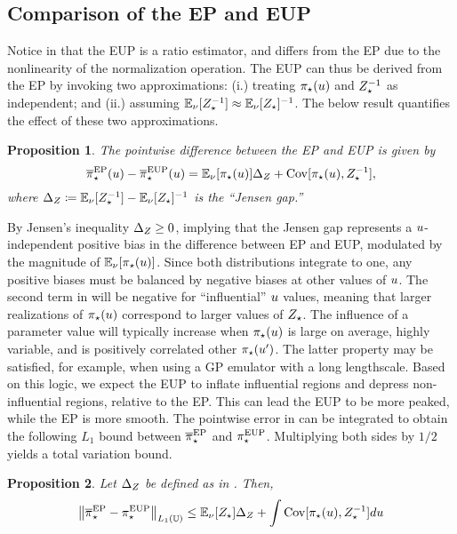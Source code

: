 \documentclass[12pt]{article}
\newtheorem{prop}{Proposition}
\begin{document}
\subsection{Comparison of the EP and EUP}
Notice in  that the EUP is a ratio estimator, and differs from 
the EP due to the nonlinearity of the normalization operation. The EUP can thus 
be derived from the EP by invoking two approximations: 
(i.) treating ${\pi}_{\star}(u)$ and ${Z}_{\star}^{-1}$ as independent; and 
(ii.) assuming $\mathbb{E}_{\nu}[{Z}_{\star}^{-1}] \approx \mathbb{E}_{\nu}[{Z}_{\star}]^{-1}$.
The below result quantifies the effect of these two approximations.

\begin{prop} \label{prop:ep-eup-pw-err}
The pointwise difference between the EP and EUP is given by
\begin{equation}
{\overline{\pi}}_{\star}^{\mathrm{EP}}(u) - {\overline{\pi}}_{\star}^{\mathrm{EUP}}(u)
= \mathbb{E}_{\nu}[{\pi}_{\star}(u)] \Delta_Z + \mathrm{Cov}[{\pi}_{\star}(u), {Z}_{\star}^{-1}],
\label{eq:ep-eup-pw-err}
\end{equation}
where $\Delta_Z \coloneqq \mathbb{E}_{\nu}[{Z}_{\star}^{-1}] - \mathbb{E}_{\nu}[{Z}_{\star}]^{-1}$
is the ``Jensen gap.''
\end{prop}

By Jensen's inequality $\Delta_Z \geq 0$, implying that the Jensen gap represents a 
$u$-independent positive bias in the difference between EP and EUP, modulated by the magnitude of 
$\mathbb{E}_{\nu}[{\pi}_{\star}(u)]$. Since both distributions integrate to one, any positive 
biases must be balanced by negative biases at other values of $u$.
The second term in  will be negative for ``influential'' $u$ values, 
meaning that larger realizations of ${\pi}_{\star}(u)$ correspond to larger values of 
${Z}_{\star}$. The influence of a parameter value will typically increase when 
${\pi}_{\star}(u)$ is large on average, highly variable, and is positively correlated other 
${\pi}_{\star}(u^\prime)$. The latter property may be satisfied, for example, when using 
a GP emulator with a long lengthscale. Based on this logic, we expect the EUP to inflate 
influential regions and depress non-influential regions, relative to the EP. This can lead 
the EUP to be more peaked, while the EP is more smooth. The pointwise error in 
 can be integrated to obtain the following $L_1$ bound 
between ${\overline{\pi}}_{\star}^{\mathrm{EP}}$ and ${\pi}_{\star}^{\mathrm{EUP}}$. Multiplying both sides by $1/2$
yields a total variation bound.

\begin{prop} \label{prop:ep-eup-TV-err}
Let $\Delta_Z$ be defined as in . Then,
\begin{equation}
\left\lVert{\overline{\pi}}_{\star}^{\mathrm{EP}} - {\pi}_{\star}^{\mathrm{EUP}}\right\rVert_{L_1(\mathbb{U})}
\leq \mathbb{E}_{\nu}[{Z}_{\star}] \Delta_Z + \int \mathrm{Cov}[{\pi}_{\star}(u), {Z}_{\star}^{-1}] du
\label{eq:ep-eup-TV-err}
\end{equation}
\end{prop}
\end{document}
